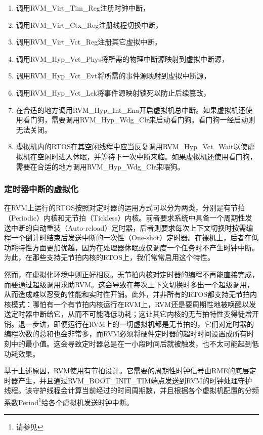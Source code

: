 \begin{enumerate}
\def\labelenumi{{[}\arabic{enumi}{]}}
\item
  调用RVM\_Virt\_Tim\_Reg注册时钟中断，
\item
  调用RVM\_Virt\_Ctx\_Reg注册线程切换中断，
\item
  调用RVM\_Virt\_Vct\_Reg注册其它虚拟中断，
\item
  调用RVM\_Hyp\_Vct\_Phys将所需的物理中断源映射到虚拟中断源，
\item
  调用RVM\_Hyp\_Vct\_Evt将所需的事件源映射到虚拟中断源，
\item
  调用RVM\_Hyp\_Vct\_Lck将事件源映射锁死以防止后续篡改，
\item
  在合适的地方调用RVM\_Hyp\_Int\_Ena开启虚拟机总中断。如果虚拟机还使用看门狗，需要调用RVM\_Hyp\_Wdg\_Clr来启动看门狗。看门狗一经启动则无法关闭。
\item
  虚拟机内的RTOS在其空闲线程中应当反复调用RVM\_Hyp\_Vct\_Wait以使虚拟机在空闲时进入休眠，并等待下一次中断来临。如果虚拟机还使用看门狗，需要在合适的地方调用RVM\_Hyp\_Wdg\_Clr来喂狗。
\end{enumerate}

\subsubsection{定时器中断的虚拟化}\label{subsubsec:2-2-4-1}

在RVM上运行的RTOS按照对定时器的运用方式可以分为两类，分别是有节拍（Periodic）内核和无节拍（Tickless）内核。前者要求系统中具备一个周期性发送中断的自动重装（Auto-reload）定时器，后者则要求每次上下文切换时按需编程一个倒计时结束后发送中断的一次性（One-shot）定时器。在裸机上，后者在低功耗特性方面更加优越，因为在处理器休眠或仅调度一个任务时不产生时钟中断。为此，在那些支持无节拍内核的RTOS上，我们常常启用这个特性。

然而，在虚拟化环境中则正好相反。无节拍内核对定时器的编程不再能直接完成，而要通过超级调用求助RVM。这会导致在每次上下文切换时多出一个超级调用，从而造成难以忍受的性能和实时性开销。此外，并非所有的RTOS都支持无节拍内核模式：哪怕有一个有节拍内核运行在RVM上，RVM还是要周期性地被唤醒以发送定时器中断给它，从而不可能降低功耗；这让其它内核的无节拍特性变得徒增开销。退一步讲，即便运行在RVM上的一切虚拟机都是无节拍的，它们对定时器的编程次数的总和也会非常多，而RVM必须将硬件定时器的超时时间设置成所有时刻中的最小值。这会导致定时器总是在一小段时间后就被触发，也不太可能起到低功耗效果。

基于上述原因，RVM使用有节拍设计。它需要的周期性时钟信号由RME的底层定时器产生，并且通过RVM\_BOOT\_INIT\_TIM端点发送到RVM的时钟处理守护线程。该守护线程会计算当前经过的时间周期数，并且根据各个虚拟机配置的分频系数Period\footnote{请参见}给各个虚拟机发送时钟中断。

